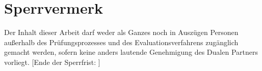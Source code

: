 \chapter*{Sperrvermerk}
\glqq Der Inhalt dieser Arbeit darf weder als Ganzes noch in Auszügen Personen außerhalb des Prüfungsprozesses und des Evaluationsverfahrens zugänglich gemacht werden, sofern keine anders
lautende Genehmigung des Dualen Partners vorliegt.\grqq{} [Ende der Sperrfrist: \SperrvermerkAuslaufDatum]

